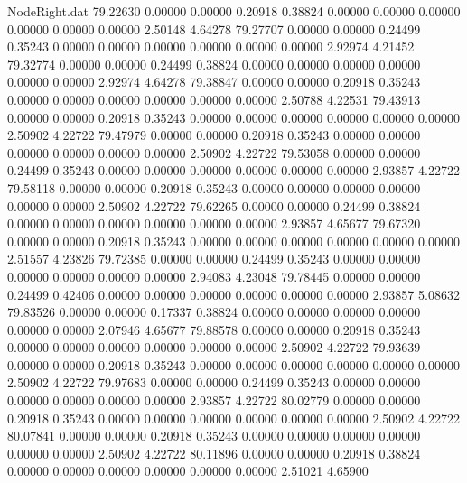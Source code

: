 \begin{filecontents}{NodeRight.dat}
  79.22630    0.00000    0.00000     0.20918    0.38824    0.00000    0.00000    0.00000    0.00000    0.00000    0.00000    2.50148    4.64278
  79.27707    0.00000    0.00000     0.24499    0.35243    0.00000    0.00000    0.00000    0.00000    0.00000    0.00000    2.92974    4.21452
  79.32774    0.00000    0.00000     0.24499    0.38824    0.00000    0.00000    0.00000    0.00000    0.00000    0.00000    2.92974    4.64278
  79.38847    0.00000    0.00000     0.20918    0.35243    0.00000    0.00000    0.00000    0.00000    0.00000    0.00000    2.50788    4.22531
  79.43913    0.00000    0.00000     0.20918    0.35243    0.00000    0.00000    0.00000    0.00000    0.00000    0.00000    2.50902    4.22722
  79.47979    0.00000    0.00000     0.20918    0.35243    0.00000    0.00000    0.00000    0.00000    0.00000    0.00000    2.50902    4.22722
  79.53058    0.00000    0.00000     0.24499    0.35243    0.00000    0.00000    0.00000    0.00000    0.00000    0.00000    2.93857    4.22722
  79.58118    0.00000    0.00000     0.20918    0.35243    0.00000    0.00000    0.00000    0.00000    0.00000    0.00000    2.50902    4.22722
  79.62265    0.00000    0.00000     0.24499    0.38824    0.00000    0.00000    0.00000    0.00000    0.00000    0.00000    2.93857    4.65677
  79.67320    0.00000    0.00000     0.20918    0.35243    0.00000    0.00000    0.00000    0.00000    0.00000    0.00000    2.51557    4.23826
  79.72385    0.00000    0.00000     0.24499    0.35243    0.00000    0.00000    0.00000    0.00000    0.00000    0.00000    2.94083    4.23048
  79.78445    0.00000    0.00000     0.24499    0.42406    0.00000    0.00000    0.00000    0.00000    0.00000    0.00000    2.93857    5.08632
  79.83526    0.00000    0.00000     0.17337    0.38824    0.00000    0.00000    0.00000    0.00000    0.00000    0.00000    2.07946    4.65677
  79.88578    0.00000    0.00000     0.20918    0.35243    0.00000    0.00000    0.00000    0.00000    0.00000    0.00000    2.50902    4.22722
  79.93639    0.00000    0.00000     0.20918    0.35243    0.00000    0.00000    0.00000    0.00000    0.00000    0.00000    2.50902    4.22722
  79.97683    0.00000    0.00000     0.24499    0.35243    0.00000    0.00000    0.00000    0.00000    0.00000    0.00000    2.93857    4.22722
  80.02779    0.00000    0.00000     0.20918    0.35243    0.00000    0.00000    0.00000    0.00000    0.00000    0.00000    2.50902    4.22722
  80.07841    0.00000    0.00000     0.20918    0.35243    0.00000    0.00000    0.00000    0.00000    0.00000    0.00000    2.50902    4.22722
  80.11896    0.00000    0.00000     0.20918    0.38824    0.00000    0.00000    0.00000    0.00000    0.00000    0.00000    2.51021    4.65900

\end{filecontents}
